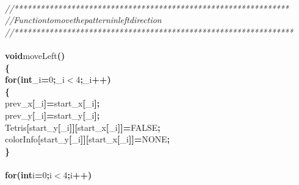 \documentclass[a4paper, 10pt]{article}
\newcommand\SPC{\hspace*{0.6em}}
\newcommand{\CppAComment}[1]{\textit{\textcolor[rgb]{0.2,0.6,1}{#1}}}
\newcommand{\CppAIdentifier}[1]{#1}
\newcommand{\CppANumber}[1]{\textcolor[rgb]{0.5,0,0.5}{#1}}
\newcommand{\CppAReservedWord}[1]{\textbf{#1}}
\newcommand{\CppASpace}[1]{\colorbox[rgb]{1,1,1}{#1}}
\newcommand{\CppASymbol}[1]{\textbf{\textcolor[rgb]{1,0,0}{#1}}}
\begin{document}
\begin{ttfamily}
\\
\CppAComment{//***************************************************************}\\
\CppAComment{//\SPC \SPC \SPC Function\SPC to\SPC move\SPC the\SPC pattern\SPC in\SPC left\SPC direction}\\
\CppAComment{//****************************************************************}\\
\\
\CppAReservedWord{void}\CppASpace{\SPC }\CppAIdentifier{moveLeft}\CppASymbol{(}\CppASymbol{)}\\
\CppASymbol{\{}\\
\CppASpace{\SPC }\CppAReservedWord{for}\CppASymbol{(}\CppAReservedWord{int}\CppASpace{\SPC }\CppAIdentifier{\_i}\CppASymbol{=}\CppANumber{0}\CppASymbol{;}\CppAIdentifier{\_i}\CppASymbol{$<$}\CppANumber{4}\CppASymbol{;}\CppAIdentifier{\_i}\CppASymbol{++}\CppASymbol{)}\\
\CppASpace{\SPC }\CppASymbol{\{}\\
\CppASpace{\SPC \SPC }\CppAIdentifier{prev\_x}\CppASymbol{[}\CppAIdentifier{\_i}\CppASymbol{]}\CppASymbol{=}\CppAIdentifier{start\_x}\CppASymbol{[}\CppAIdentifier{\_i}\CppASymbol{]}\CppASymbol{;}\\
\CppASpace{\SPC \SPC }\CppAIdentifier{prev\_y}\CppASymbol{[}\CppAIdentifier{\_i}\CppASymbol{]}\CppASymbol{=}\CppAIdentifier{start\_y}\CppASymbol{[}\CppAIdentifier{\_i}\CppASymbol{]}\CppASymbol{;}\\
\CppASpace{\SPC \SPC }\CppAIdentifier{Tetris}\CppASymbol{[}\CppAIdentifier{start\_y}\CppASymbol{[}\CppAIdentifier{\_i}\CppASymbol{]}\CppASymbol{]}\CppASymbol{[}\CppAIdentifier{start\_x}\CppASymbol{[}\CppAIdentifier{\_i}\CppASymbol{]}\CppASymbol{]}\CppASymbol{=}\CppAIdentifier{FALSE}\CppASymbol{;}\\
\CppASpace{\SPC \SPC }\CppAIdentifier{colorInfo}\CppASymbol{[}\CppAIdentifier{start\_y}\CppASymbol{[}\CppAIdentifier{\_i}\CppASymbol{]}\CppASymbol{]}\CppASymbol{[}\CppAIdentifier{start\_x}\CppASymbol{[}\CppAIdentifier{\_i}\CppASymbol{]}\CppASymbol{]}\CppASymbol{=}\CppAIdentifier{NONE}\CppASymbol{;}\\
\CppASpace{\SPC }\CppASymbol{\}}\\
\\
\CppASpace{\SPC }\CppAReservedWord{for}\CppASymbol{(}\CppAReservedWord{int}\CppASpace{\SPC }\CppAIdentifier{i}\CppASymbol{=}\CppANumber{0}\CppASymbol{;}\CppAIdentifier{i}\CppASymbol{$<$}\CppANumber{4}\CppASymbol{;}\CppAIdentifier{i}\CppASymbol{++}\CppASymbol{)}\\

\end{ttfamily}
\end{document}
